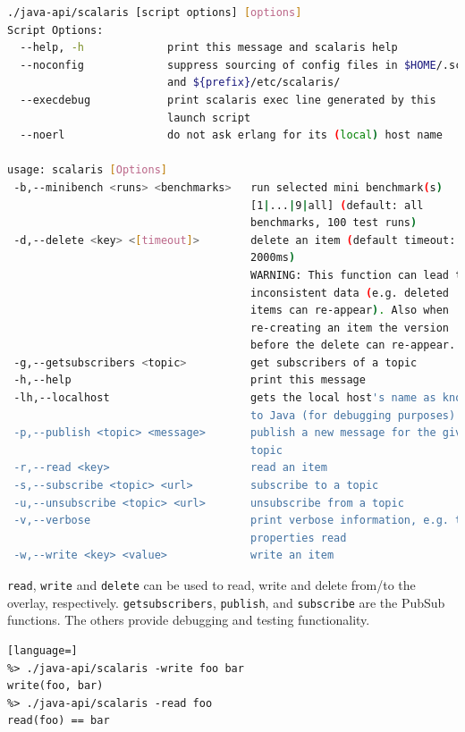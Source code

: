 \documentclass[a4paper]{scrreprt}
\newcommand{\code}[1]{\lstinline[basicstyle=\ttfamily]!#1!}
\begin{document}
\begin{lstlisting}[language=sh]
%> ./java-api/scalaris --help
./java-api/scalaris [script options] [options]
Script Options:
  --help, -h             print this message and scalaris help
  --noconfig             suppress sourcing of config files in $HOME/.scalaris/
                         and ${prefix}/etc/scalaris/
  --execdebug            print scalaris exec line generated by this
                         launch script
  --noerl                do not ask erlang for its (local) host name
  
usage: scalaris [Options]
 -b,--minibench <runs> <benchmarks>   run selected mini benchmark(s)
                                      [1|...|9|all] (default: all
                                      benchmarks, 100 test runs)
 -d,--delete <key> <[timeout]>        delete an item (default timeout:
                                      2000ms)
                                      WARNING: This function can lead to
                                      inconsistent data (e.g. deleted
                                      items can re-appear). Also when
                                      re-creating an item the version
                                      before the delete can re-appear.
 -g,--getsubscribers <topic>          get subscribers of a topic
 -h,--help                            print this message
 -lh,--localhost                      gets the local host's name as known
                                      to Java (for debugging purposes)
 -p,--publish <topic> <message>       publish a new message for the given
                                      topic
 -r,--read <key>                      read an item
 -s,--subscribe <topic> <url>         subscribe to a topic
 -u,--unsubscribe <topic> <url>       unsubscribe from a topic
 -v,--verbose                         print verbose information, e.g. the
                                      properties read
 -w,--write <key> <value>             write an item
\end{lstlisting}

\code{read}, \code{write} and \code{delete} can be used to read, write
and delete from/to the overlay, respectively. \code{getsubscribers},
\code{publish}, and \code{subscribe} are the PubSub functions. The others
provide debugging and testing functionality.

\begin{lstlisting}[language=]
%> ./java-api/scalaris -write foo bar
write(foo, bar)
%> ./java-api/scalaris -read foo
read(foo) == bar
\end{lstlisting}
\end{document}
